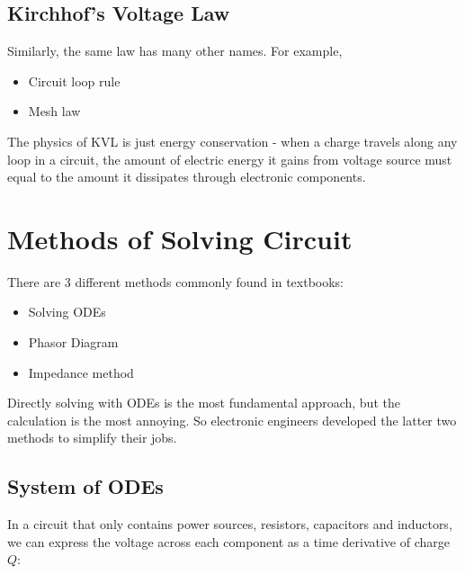 \documentclass[class=article, crop=false, 12pt]{standalone}
\begin{document}

\subsection{Kirchhof's Voltage Law}


Similarly, the same law has many other names.
For example, 
\begin{itemize}
    \item Circuit loop rule
    \item Mesh law
\end{itemize}

The physics of KVL is just energy conservation - 
when a charge travels along any loop in a circuit,
the amount of electric energy it gains from voltage source 
must equal to the amount it dissipates through electronic components.




\linesep
\section{Methods of Solving Circuit}

There are 3 different methods commonly found in textbooks:
\begin{itemize}
    \item Solving ODEs
    \item Phasor Diagram
    \item Impedance method
\end{itemize}

Directly solving with ODEs is the most fundamental approach,
but the calculation is the most annoying. 
So electronic engineers developed the latter two methods to simplify their jobs.

\subsection{System of ODEs}

In a circuit that only contains power sources, resistors, capacitors and inductors, 
we can express the voltage across each component as a time derivative of charge $Q$:
\end{document}
